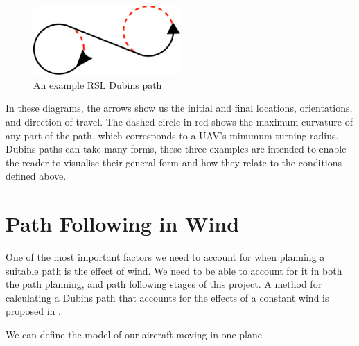 \begin{figure}[htbp!] 
\centering    
\includegraphics[width=0.5\textwidth]{RSL}
\caption[Dubins RSL Path]{An example RSL Dubins path}
\label{fig:rsl}
\end{figure}

In these diagrams, the arrows show us the initial and final locations, orientations, and direction of travel. The dashed circle in red shows the maximum curvature of any part of the path, which corresponds to a UAV's minumum turning radius. Dubins paths can take many forms, these three examples are intended to enable the reader to visualise their general form and how they relate to the conditions defined above.


\section{Path Following in Wind}
\label{litrev:path}

One of the most important factors we need to account for when planning a suitable path is the effect of wind. We need to be able to account for it in both the path planning, and path following stages of this project. A method for calculating a Dubins path that accounts for the effects of a constant wind is proposed in \cite{mcgee2005optimal}.

We can define the model of our aircraft moving in one plane 